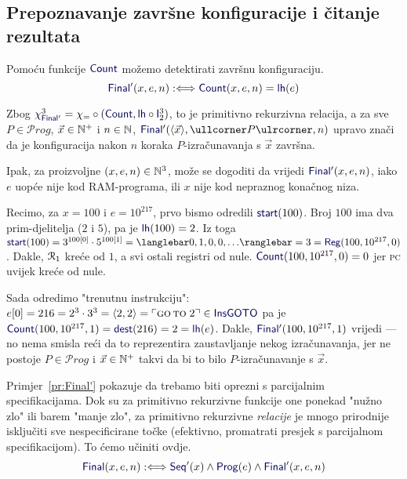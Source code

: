 \subsection{Prepoznavanje završne konfiguracije i čitanje rezultata}

Pomoću funkcije $\f{Count}$ možemo detektirati završnu konfiguraciju.
\begin{equation}
    \f{Final}'(x,e,n):\Longleftrightarrow\f{Count}(x,e,n)\eq\f{lh}(e)
\end{equation}

Zbog $\chi_{\f{Final}'}^3=\chi_\eq\circ(\f{Count},\f{lh}\circ\f I_2^3)$, to je primitivno rekurzivna relacija, a za sve $P\in\mathscr Prog$, $\vec x\in{\mathbb N}^+$ i $n\in{\mathbb N}$, $\f{Final}'(\langle\vec x\rangle,\kprog P,n)$ upravo znači da je konfiguracija nakon $n$ koraka $P$-izračunavanja s $\vec x$ završna.

Ipak, za proizvoljne $(x,e,n)\in{\mathbb N}^3$, može se dogoditi da vrijedi $\f{Final}'(x,e,n)$, iako $e$ uopće nije kod RAM-programa, ili $x$ nije kod nepraznog konačnog niza.

\begin{primjer}[{name=[neintuitivnost parcijalno specificiranih relacija]}]\label{pr:Final'}
Recimo, za $x=100$ i $e=10^{217}$, prvo bismo odredili
$\f{start}(100)$. Broj $100$ ima dva prim-djelitelja ($2$ i $5$), pa je $\f{lh}(100)=2$. Iz toga $\f{start}(100)=3^{100[0]}\cdot5^{100[1]}=\knk{0,1,0,0,\dotsc}=3=\f{Reg}(100,10^{217},0)$. Dakle, $\mathcal R_{1}$ kreće od $1$, a svi ostali registri od nule.  $\f{Count}(100,10^{217},0)=0$ jer \textsc{pc} uvijek kreće od nule.

Sada odredimo "trenutnu instrukciju": $e[0]=216=2^3\cdot3^3=\langle2,2\rangle=\kins{\goto\;2}\in\f{InsGOTO}$ pa je $\f{Count}(100,10^{217},1)=\f{dest}(216)=2=\f{lh}(e)$. Dakle, $\f{Final}'(100,10^{217},1)$ vrijedi --- no nema smisla reći da to reprezentira zaustavljanje nekog iz\-ra\-ču\-na\-va\-nja, jer ne postoje $P\in\mathscr Prog$ i $\vec x\in{\mathbb N}^+$ takvi da bi to bilo $P$-izračunavanje s $\vec x$.
\end{primjer}

Primjer~\ref{pr:Final'} pokazuje da trebamo biti oprezni s parcijalnim specifikacijama. Dok su za primitivno rekurzivne funkcije one ponekad "nužno zlo" ili barem "manje zlo", za primitivno rekurzivne \emph{relacije} je mnogo prirodnije isključiti sve nespecificirane točke (efektivno, promatrati presjek s parcijalnom specifikacijom). To ćemo učiniti ovdje.
\begin{equation}
\f{Final}(x,e,n):\Longleftrightarrow\f{Seq'}(x)\land\f{Prog}(e)\land\f{Final}'(x,e,n)
\end{equation}


